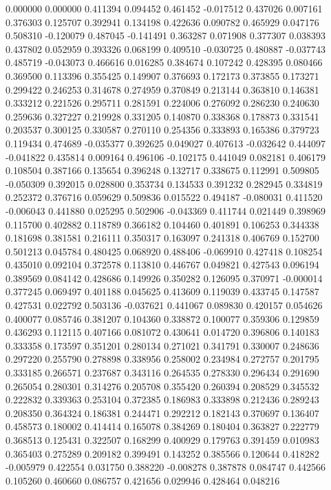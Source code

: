 0.000000
0.000000
0.411394
0.094452
0.461452
-0.017512
0.437026
0.007161
0.376303
0.125707
0.392941
0.134198
0.422636
0.090782
0.465929
0.047176
0.508310
-0.120079
0.487045
-0.141491
0.363287
0.071908
0.377307
0.038393
0.437802
0.052959
0.393326
0.068199
0.409510
-0.030725
0.480887
-0.037743
0.485719
-0.043073
0.466616
0.016285
0.384674
0.107242
0.428395
0.080466
0.369500
0.113396
0.355425
0.149907
0.376693
0.172173
0.373855
0.173271
0.299422
0.246253
0.314678
0.274959
0.370849
0.213144
0.363810
0.146381
0.333212
0.221526
0.295711
0.281591
0.224006
0.276092
0.286230
0.240630
0.259636
0.327227
0.219928
0.331205
0.140870
0.338368
0.178873
0.331541
0.203537
0.300125
0.330587
0.270110
0.254356
0.333893
0.165386
0.379723
0.119434
0.474689
-0.035377
0.392625
0.049027
0.407613
-0.032642
0.444097
-0.041822
0.435814
0.009164
0.496106
-0.102175
0.441049
0.082181
0.406179
0.108504
0.387166
0.135654
0.396248
0.132717
0.338675
0.112991
0.509805
-0.050309
0.392015
0.028800
0.353734
0.134533
0.391232
0.282945
0.334819
0.252372
0.376716
0.059629
0.509836
0.015522
0.494187
-0.080031
0.411520
-0.006043
0.441880
0.025295
0.502906
-0.043369
0.411744
0.021449
0.398969
0.115700
0.402882
0.118789
0.366182
0.104460
0.401891
0.106253
0.344338
0.181698
0.381581
0.216111
0.350317
0.163097
0.241318
0.406769
0.152700
0.501213
0.045784
0.480425
0.068920
0.488406
-0.069910
0.427418
0.108254
0.435010
0.092104
0.372578
0.113810
0.446767
0.049821
0.427543
0.096194
0.389569
0.084142
0.428686
0.149926
0.350282
0.126095
0.370971
-0.000014
0.377245
0.069497
0.401188
0.045625
0.413609
0.119039
0.433745
0.147587
0.427531
0.022792
0.503136
-0.037621
0.441067
0.089830
0.420157
0.054626
0.400077
0.085746
0.381207
0.104360
0.338872
0.100077
0.359306
0.129859
0.436293
0.112115
0.407166
0.081072
0.430641
0.014720
0.396806
0.140183
0.333358
0.173597
0.351201
0.280134
0.271021
0.341791
0.330007
0.248636
0.297220
0.255790
0.278898
0.338956
0.258002
0.234984
0.272757
0.201795
0.333185
0.266571
0.237687
0.343116
0.264535
0.278330
0.296434
0.291690
0.265054
0.280301
0.314276
0.205708
0.355420
0.260394
0.208529
0.345532
0.222832
0.339363
0.253104
0.372385
0.186983
0.333898
0.212436
0.289243
0.208350
0.364324
0.186381
0.244471
0.292212
0.182143
0.370697
0.136407
0.458573
0.180002
0.414414
0.165078
0.384269
0.180404
0.363827
0.222779
0.368513
0.125431
0.322507
0.168299
0.400929
0.179763
0.391459
0.010983
0.365403
0.275289
0.209182
0.399491
0.143252
0.385566
0.120644
0.418282
-0.005979
0.422554
0.031750
0.388220
-0.008278
0.387878
0.084747
0.442566
0.105260
0.460660
0.086757
0.421656
0.029946
0.428464
0.048216
